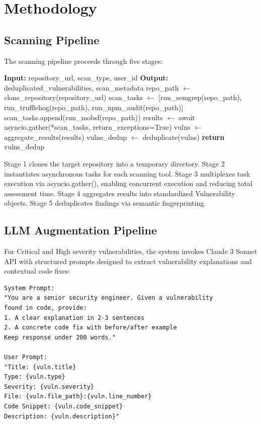 \documentclass[10pt, conference, compsocconf]{IEEEtran}
\begin{document}
\section{Methodology}
\label{sec:methodology}

\subsection{Scanning Pipeline}

The scanning pipeline proceeds through five stages:

\begin{algorithm}
\caption{Asynchronous Scanning Orchestration}
\begin{algorithmic}[1]
\State \textbf{Input:} repository\_url, scan\_type, user\_id
\State \textbf{Output:} deduplicated\_vulnerabilities, scan\_metadata
\State repo\_path $\gets$ clone\_repository(repository\_url)
\State scan\_tasks $\gets$ [run\_semgrep(repo\_path), run\_trufflehog(repo\_path), run\_npm\_audit(repo\_path)]
  \State scan\_tasks.append(run\_mobsf(repo\_path))
\EndIf
\State results $\gets$ await asyncio.gather(*scan\_tasks, return\_exceptions=True)
\State vulns $\gets$ aggregate\_results(results)
\State vulns\_dedup $\gets$ deduplicate(vulns)
\State \textbf{return} vulns\_dedup
\end{algorithmic}
\end{algorithm}

Stage 1 clones the target repository into a temporary directory. Stage 2 instantiates asynchronous tasks for each scanning tool. Stage 3 multiplexes task execution via asyncio.gather(), enabling concurrent execution and reducing total assessment time. Stage 4 aggregates results into standardized Vulnerability objects. Stage 5 deduplicates findings via semantic fingerprinting.

\subsection{LLM Augmentation Pipeline}

For Critical and High severity vulnerabilities, the system invokes Claude 3 Sonnet API with structured prompts designed to extract vulnerability explanations and contextual code fixes:

\begin{lstlisting}
System Prompt:
"You are a senior security engineer. Given a vulnerability 
found in code, provide: 
1. A clear explanation in 2-3 sentences
2. A concrete code fix with before/after example
Keep response under 200 words."

User Prompt:
"Title: {vuln.title}
Type: {vuln.type}
Severity: {vuln.severity}
File: {vuln.file_path}:{vuln.line_number}
Code Snippet: {vuln.code_snippet}
Description: {vuln.description}"
\end{lstlisting}
\end{document}
